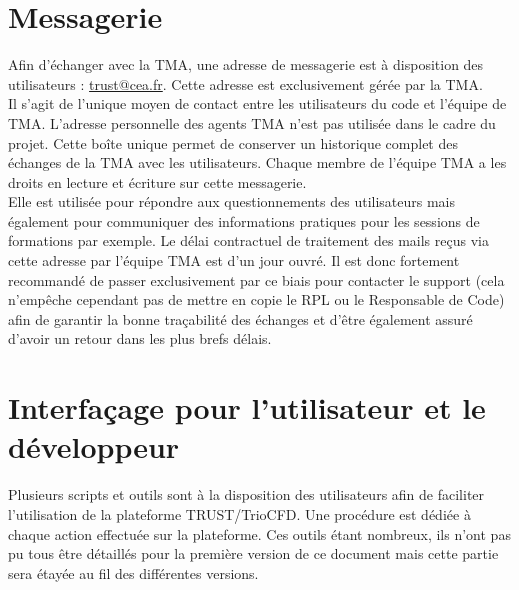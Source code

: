 \chapter{\label{chapitre:messagerie}Messagerie}

Afin d'échanger avec la TMA, une adresse de messagerie est \`a disposition des utilisateurs : \href{mailto:trust@cea.fr}{trust@cea.fr}. Cette adresse est exclusivement g\'er\'ee par la TMA.\\
Il s'agit de l'unique moyen de contact entre les utilisateurs du code et l'équipe de TMA. L'adresse personnelle des agents TMA n'est pas utilisée dans le cadre du projet. Cette boîte unique permet de conserver un historique complet des échanges de la TMA avec les utilisateurs. Chaque membre de l'équipe TMA a les droits en lecture et écriture sur cette messagerie.\\
Elle est utilisée pour répondre aux questionnements des utilisateurs mais également pour communiquer des informations pratiques pour les sessions de formations par exemple. Le délai contractuel de traitement des mails re\c cus via cette adresse par l'équipe TMA est d'un jour ouvré. Il est donc fortement recommandé de passer exclusivement par ce biais pour contacter le support (cela n'empêche cependant pas de mettre en copie le RPL ou le Responsable de Code) afin de garantir la bonne tra\c cabilité des échanges et d'être également assuré d'avoir un retour dans les plus brefs délais.



\chapter{Interfa\c cage pour l'utilisateur et le d\'eveloppeur}
Plusieurs scripts et outils sont à la disposition des utilisateurs afin de faciliter l'utilisation de la plateforme TRUST/TrioCFD. Une procédure est dédiée à chaque action effectuée sur la plateforme. Ces outils étant nombreux, ils n'ont pas pu tous être détaillés pour la première version de ce document mais cette partie sera étayée au fil des différentes versions.
